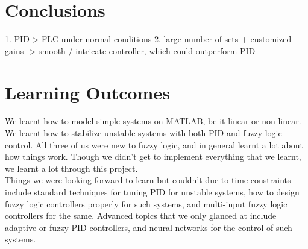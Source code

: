 \section{Conclusions}

1. PID > FLC under normal conditions
2. large number of sets + customized gains -> smooth / intricate controller, which could outperform PID

\section{Learning Outcomes}

We learnt how to model simple systems on MATLAB, be it linear or non-linear. We learnt how to stabilize unstable systems with both PID and fuzzy logic control. All three of us were new to fuzzy logic, and in general learnt a lot about how things work. Though we didn't get to implement everything that we learnt, we learnt a lot through this project. \\

Things we were looking forward to learn but couldn't due to time constraints include standard techniques for tuning PID for unstable systems, how to design fuzzy logic controllers properly for such systems, and multi-input fuzzy logic controllers for the same. Advanced topics that we only glanced at include adaptive or fuzzy PID controllers, and neural networks for the control of such systems. 